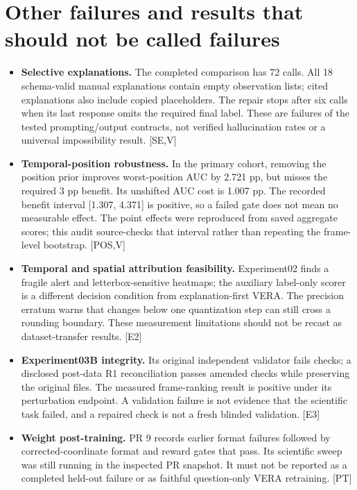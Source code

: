 \documentclass[11pt]{article}
\newcommand{\src}[1]{\textsf{[#1]}}
\begin{document}
\section{Other failures and results that should not be called failures}
\begin{itemize}
\item \textbf{Selective explanations.} The completed comparison has 72 calls. All 18 schema-valid manual explanations contain empty observation lists; cited explanations also include copied placeholders. The repair stops after six calls when its last response omits the required final label. These are failures of the tested prompting/output contracts, not verified hallucination rates or a universal impossibility result. \src{SE,V}
\item \textbf{Temporal-position robustness.} In the primary cohort, removing the position prior improves worst-position AUC by 2.721 pp, but misses the required 3 pp benefit. Its unshifted AUC cost is 1.007 pp. The recorded benefit interval [1.307, 4.371] is positive, so a failed gate does not mean no measurable effect. The point effects were reproduced from saved aggregate scores; this audit source-checks that interval rather than repeating the frame-level bootstrap. \src{POS,V}
\item \textbf{Temporal and spatial attribution feasibility.} Experiment02 finds a fragile alert and letterbox-sensitive heatmaps; the auxiliary label-only scorer is a different decision condition from explanation-first VERA. The precision erratum warns that changes below one quantization step can still cross a rounding boundary. These measurement limitations should not be recast as dataset-transfer results. \src{E2}
\item \textbf{Experiment03B integrity.} Its original independent validator fails checks; a disclosed post-data R1 reconciliation passes amended checks while preserving the original files. The measured frame-ranking result is positive under its perturbation endpoint. A validation failure is not evidence that the scientific task failed, and a repaired check is not a fresh blinded validation. \src{E3}
\item \textbf{Weight post-training.} PR 9 records earlier format failures followed by corrected-coordinate format and reward gates that pass. Its scientific sweep was still running in the inspected PR snapshot. It must not be reported as a completed held-out failure or as faithful question-only VERA retraining. \src{PT}
\end{itemize}
\end{document}
